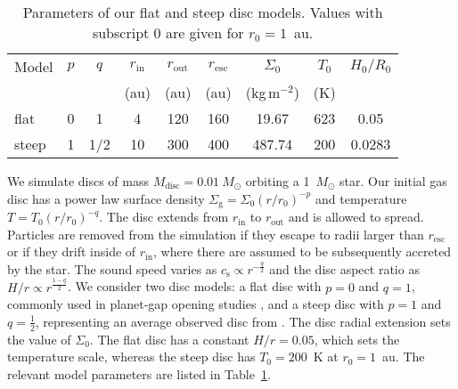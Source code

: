 \documentclass[a4paper,fleqn,usenatbib]{mnras}
\begin{document}
\begin{table}
\caption{Parameters of our flat and steep disc models. Values with subscript 0 are given for $r_0=1$~au.}
\label{Tab:DiscParam}
\begin{center}
\begin{tabular}{@{}l@{\quad}c@{\quad}c@{\quad}c@{\quad}c@{\quad}c@{\quad}c@{\quad}c@{\quad}c@{}}
\hline
Model & $p$ & $q$ & $r_\mathrm{in}$ & $r_\mathrm{out}$ & $r_\mathrm{esc}$ & $\Sigma_0$ & $T_0$ & $H_0/R_0$ \\
&&& (au) & (au) & (au) & (kg\,m$^{-2}$) & (K) \\
\hline
flat  & 0 & 1   &  4 & 120 & 160 & 19.67  & 623 & 0.05 \\
steep & 1 & 1/2 & 10 & 300 & 400 & 487.74 & 200 & 0.0283 \\
\hline
\end{tabular}
\end{center}
\end{table}

We simulate discs of mass $M_\mathrm{disc}=0.01\ M_\odot$ orbiting a 1~$M_\odot$ star. Our initial gas disc has a power law surface density $\Sigma_\mathrm{g}=\Sigma_0(r/r_0)^{-p}$ and temperature $T=T_0(r/r_0)^{-q}$. The disc extends from $r_\mathrm{in}$ to $r_\mathrm{out}$ and is allowed to spread. Particles are removed from the simulation if they escape to radii larger than $r_\mathrm{esc}$ or if they drift inside of $r_\mathrm{in}$, where there are assumed to be subsequently accreted by the star. The sound speed varies as $c_\mathrm{s}\propto r^{-\frac{q}{2}}$ and the disc aspect ratio as $H/r\propto r^\frac{1-q}{2}$. We consider two disc models: a flat disc with $p=0$ and $q=1$, commonly used in planet-gap opening studies \citep{Paardekooper2004,Paardekooper2006,Fouchet2007,Fouchet2010,Gonzalez2015a}, and a steep disc with $p=1$ and $q=\frac{1}{2}$, representing an average observed disc from \citet{Williams2014}. The disc radial extension sets the value of $\Sigma_0$. The flat disc has a constant $H/r=0.05$, which sets the temperature scale, whereas the steep disc has $T_0=200$~K at $r_0=1$~au. The relevant model parameters are listed in Table~\ref{Tab:DiscParam}.
\end{document}
